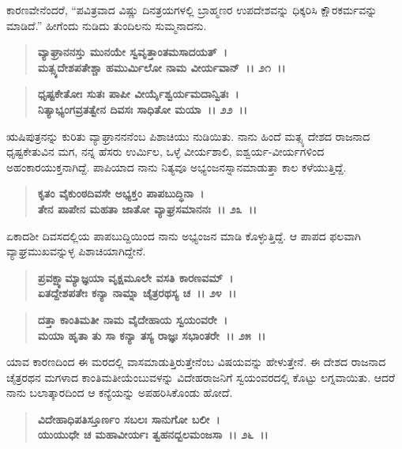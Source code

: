 ಕಾರಣವೇನೆಂದರೆ, “ಪವಿತ್ರವಾದ ವಿಷ್ಣು ದಿನತ್ರಯಗಳಲ್ಲಿ ಬ್ರಾಹ್ಮಣರ ಉಪದೇಶವನ್ನು ಧಿಕ್ಕರಿಸಿ ಕ್ಷೌರಕರ್ಮವನ್ನು ಮಾಡಿದೆ.” ಹೀಗೆಂದು ನುಡಿದು ತುಂದಿಲನು ಸುಮ್ಮನಾದನು.

\begin{verse}
\textbf{ವ್ಯಾಘ್ರಾನನಸ್ತು ಮುನಯೇ ಸ್ವವೃತ್ತಾಂತಮಸಾದಯತ್~।}\\\textbf{ಮತ್ಸ್ಯದೇಶಪತೇಶ್ಚಾ ಹಮುರ್ಮಿಲೋ ನಾಮ ವೀರ್ಯವಾನ್~।। ೨೧~।। }
\end{verse}

\begin{verse}
\textbf{ಧೃಷ್ಟಕೇತೋಃ ಸುತಃ ಪಾಪೀ ವೀರ್ಯೈಶ್ವರ್ಯಮದಾನ್ವಿತಃ~।}\\\textbf{ನಿತ್ಯಾಭ್ಯಂಗವ್ರತತ್ವೇನ ದಿವಸಃ ಸಾಧಿತೋ ಮಯಾ~।। ೨೨~।। }
\end{verse}

ಋಷಿಪುತ್ರನನ್ನು ಕುರಿತು ವ್ಯಾಘ್ರಾನನನೆಂಬ ಪಿಶಾಚಿಯು ನುಡಿಯಿತು. ನಾನು ಹಿಂದೆ ಮತ್ಸ್ಯ ದೇಶದ ರಾಜನಾದ ಧೃಷ್ಟಕೇತುವಿನ ಮಗ, ನನ್ನ ಹೆಸರು ಉರ್ಮಿಲ, ಒಳ್ಳೆ ವೀರ್ಯಶಾಲಿ, ಐಶ್ವರ್ಯ-ವೀರ್ಯಗಳಿಂದ ಅಹಂಕಾರಯುಕ್ತನಾಗಿದ್ದೆ. ಪಾಪಿಯಾದ ನಾನು ನಿತ್ಯವೂ ಅಭ್ಯಂಜನಸ್ನಾನಮಾಡುತ್ತಾ ಕಾಲ ಕಳೆಯುತ್ತಿದ್ದೆ.

\begin{verse}
\textbf{ಕೃತಂ ವೈಕುಂಠದಿವಸೇ ಅಭ್ಯಕ್ತಂ ಪಾಪಬುದ್ಧಿನಾ~।}\\\textbf{ತೇನ ಪಾಪೇನ ಮಹತಾ ಜಾತೋ ವ್ಯಾಘ್ರಸಮಾನನಃ~।। ೨೩~।। }
\end{verse}

ಏಕಾದಶೀ ದಿವಸದಲ್ಲಿಯ ಪಾಪಬುದ್ದಿಯಿಂದ ನಾನು ಅಭ್ಯಂಜನ ಮಾಡಿ ಕೊಳ್ಳುತ್ತಿದ್ದೆ. ಆ ಪಾಪದ ಫಲವಾಗಿ ವ್ಯಾಘ್ರಮುಖವನ್ನುಳ್ಳ ಪಿಶಾಚಿಯಾಗಿದ್ದೇನೆ.

\begin{verse}
\textbf{ಪ್ರವಕ್ಷ್ಯಾಮ್ಯಾಜ್ಞಯಾ ವೃಕ್ಷಮೂಲೇ ವಸತಿ ಕಾರಣವಮ್~।}\\\textbf{ಏತದ್ದೇಶಪತೇಃ ಕನ್ಯಾ ನಾಮ್ನಾ ಚೈತ್ರರಥಸ್ಯ ಚ~।। ೨೪~।।} 
\end{verse}

\begin{verse}
\textbf{ದತ್ತಾ ಕಾಂತಿಮತೀ ನಾಮ ವೈದೇಹಾಯ ಸ್ವಯಂವರೇ~।}\\\textbf{ಮಯಾ ಹೃತಾ ತು ಸಾ ಕನ್ಯಾ ತಸ್ಯ ರಾಜ್ಞಃ ಸಭಾಂತರೇ~।। ೨೫~।। }
\end{verse}

ಯಾವ ಕಾರಣದಿಂದ ಈ ಮರದಲ್ಲಿ ವಾಸಮಾಡುತ್ತಿರುತ್ತೇನೆಂಬ ವಿಷಯವನ್ನು ಹೇಳು\-ತ್ತೇನೆ. ಈ ದೇಶದ ರಾಜನಾದ ಚೈತ್ರರಥನ ಮಗಳಾದ ಕಾಂತಿಮತೀಯೆಂಬುವಳನ್ನು ವಿದೇಹರಾಜನಿಗೆ ಸ್ವಯಂವರದಲ್ಲಿ ಕೊಟ್ಟು ಲಗ್ನವಾಯಿತು. ಆದರೆ ನಾನು ಬಲಾತ್ಕಾರದಿಂದ ಆ ಕನ್ಯೆಯನ್ನು ಅಪಹರಿಸಿಕೊಂಡು ಹೋದೆ.

\begin{verse}
\textbf{ವಿದೇಹಾಧಿಪತಿಸ್ತೂರ್ಣಂ ಸಬಲಃ ಸಾನುಗೋ ಬಲೀ~।}\\\textbf{ಯುಯುಧೇ ಚ ಮಹಾವೀರ್ಯಃ ತ್ವಹನದ್ಬಲಮಂಜಸಾ~।। ೨೬~।।}
\end{verse}

